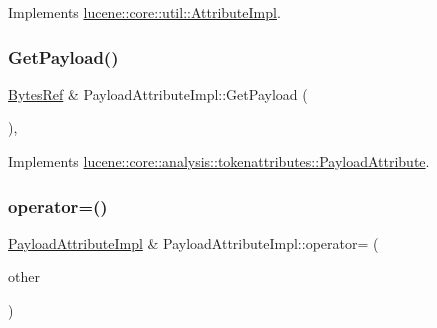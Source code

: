 Implements \mbox{\hyperlink{classlucene_1_1core_1_1util_1_1AttributeImpl_a135318ad4c7c17b3d85e625e32fb42cd}{lucene\+::core\+::util\+::\+Attribute\+Impl}}.

\mbox{\label{classlucene_1_1core_1_1analysis_1_1tokenattributes_1_1PayloadAttributeImpl_a60adf0536ed3492e2cbfc2f59846ff8d}} 
\subsubsection{\texorpdfstring{Get\+Payload()}{GetPayload()}}
{\footnotesize\ttfamily \mbox{\hyperlink{classlucene_1_1core_1_1util_1_1BytesRef}{Bytes\+Ref}} \& Payload\+Attribute\+Impl\+::\+Get\+Payload (\begin{DoxyParamCaption}{ }\end{DoxyParamCaption})\hspace{0.3cm}{\ttfamily [override]}, {\ttfamily [virtual]}}



Implements \mbox{\hyperlink{classlucene_1_1core_1_1analysis_1_1tokenattributes_1_1PayloadAttribute_ad6f64222c371631ce979ba6f7256a11d}{lucene\+::core\+::analysis\+::tokenattributes\+::\+Payload\+Attribute}}.

\mbox{\label{classlucene_1_1core_1_1analysis_1_1tokenattributes_1_1PayloadAttributeImpl_a82dd546c2275107d47d6a152cd43d04e}} 
\subsubsection{\texorpdfstring{operator=()}{operator=()}\hspace{0.1cm}{\footnotesize\ttfamily [1/2]}}
{\footnotesize\ttfamily \mbox{\hyperlink{classlucene_1_1core_1_1analysis_1_1tokenattributes_1_1PayloadAttributeImpl}{Payload\+Attribute\+Impl}} \& Payload\+Attribute\+Impl\+::operator= (\begin{DoxyParamCaption}\item[{\mbox{\hyperlink{ZlibCrc32_8h_a2c212835823e3c54a8ab6d95c652660e}{const}} \mbox{\hyperlink{classlucene_1_1core_1_1util_1_1AttributeImpl}{lucene\+::core\+::util\+::\+Attribute\+Impl}} \&}]{other }\end{DoxyParamCaption})\hspace{0.3cm}{\ttfamily [virtual]}}



